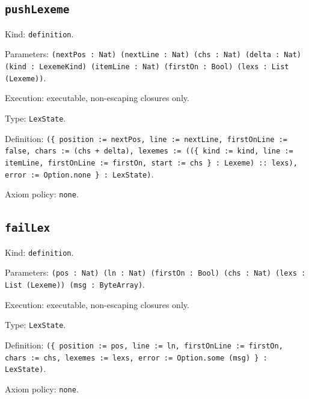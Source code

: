\documentclass[11pt]{article}
\begin{document}
\subsection*{\texttt{pushLexeme}}
\noindent Kind: \texttt{definition}.\par
\noindent Parameters: \texttt{(nextPos : Nat) (nextLine : Nat) (chs : Nat) (delta : Nat) (kind : LexemeKind) (itemLine : Nat) (firstOn : Bool) (lexs : List (Lexeme))}.\par
\noindent Execution: executable, non-escaping closures only.\par
\noindent Type: \texttt{LexState}.\par
\noindent Definition: \texttt{(\{ position := nextPos, line := nextLine, firstOnLine := false, chars := (chs + delta), lexemes := ((\{ kind := kind, line := itemLine, firstOnLine := firstOn, start := chs \} : Lexeme) :: lexs), error := Option.none \} : LexState)}.\par
\noindent Axiom policy: \texttt{none}.\par
\subsection*{\texttt{failLex}}
\noindent Kind: \texttt{definition}.\par
\noindent Parameters: \texttt{(pos : Nat) (ln : Nat) (firstOn : Bool) (chs : Nat) (lexs : List (Lexeme)) (msg : ByteArray)}.\par
\noindent Execution: executable, non-escaping closures only.\par
\noindent Type: \texttt{LexState}.\par
\noindent Definition: \texttt{(\{ position := pos, line := ln, firstOnLine := firstOn, chars := chs, lexemes := lexs, error := Option.some (msg) \} : LexState)}.\par
\noindent Axiom policy: \texttt{none}.\par
\end{document}
